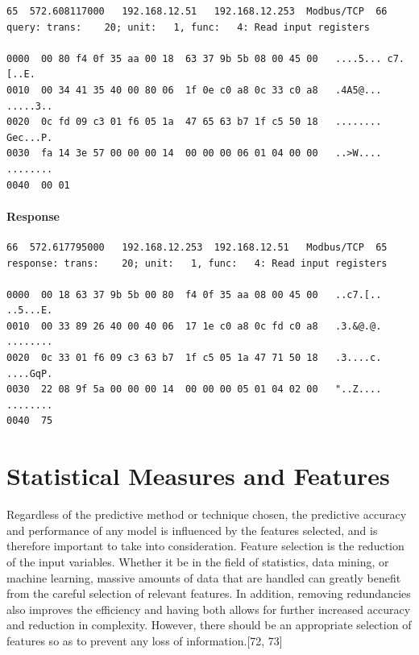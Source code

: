 \documentclass[12pt,]{article}
\begin{document}
\begin{verbatim}
65  572.608117000   192.168.12.51   192.168.12.253  Modbus/TCP  66
query: trans:    20; unit:   1, func:   4: Read input registers

0000  00 80 f4 0f 35 aa 00 18  63 37 9b 5b 08 00 45 00   ....5... c7.[..E.
0010  00 34 41 35 40 00 80 06  1f 0e c0 a8 0c 33 c0 a8   .4A5@... .....3..
0020  0c fd 09 c3 01 f6 05 1a  47 65 63 b7 1f c5 50 18   ........ Gec...P.
0030  fa 14 3e 57 00 00 00 14  00 00 00 06 01 04 00 00   ..>W.... ........
0040  00 01    
\end{verbatim}

\paragraph{Response}\label{response}

\begin{verbatim}
66  572.617795000   192.168.12.253  192.168.12.51   Modbus/TCP  65
response: trans:    20; unit:   1, func:   4: Read input registers

0000  00 18 63 37 9b 5b 00 80  f4 0f 35 aa 08 00 45 00   ..c7.[.. ..5...E.
0010  00 33 89 26 40 00 40 06  17 1e c0 a8 0c fd c0 a8   .3.&@.@. ........
0020  0c 33 01 f6 09 c3 63 b7  1f c5 05 1a 47 71 50 18   .3....c. ....GqP.
0030  22 08 9f 5a 00 00 00 14  00 00 00 05 01 04 02 00   "..Z.... ........
0040  75
\end{verbatim}

\pagebreak

\section{Statistical Measures and
Features}\label{statistical-measures-and-features}

Regardless of the predictive method or technique chosen, the predictive
accuracy and performance of any model is influenced by the features
selected, and is therefore important to take into consideration. Feature
selection is the reduction of the input variables. Whether it be in the
field of statistics, data mining, or machine learning, massive amounts
of data that are handled can greatly benefit from the careful selection
of relevant features. In addition, removing redundancies also improves
the efficiency and having both allows for further increased accuracy and
reduction in complexity. However, there should be an appropriate
selection of features so as to prevent any loss of information.{[}72,
73{]}
\end{document}

